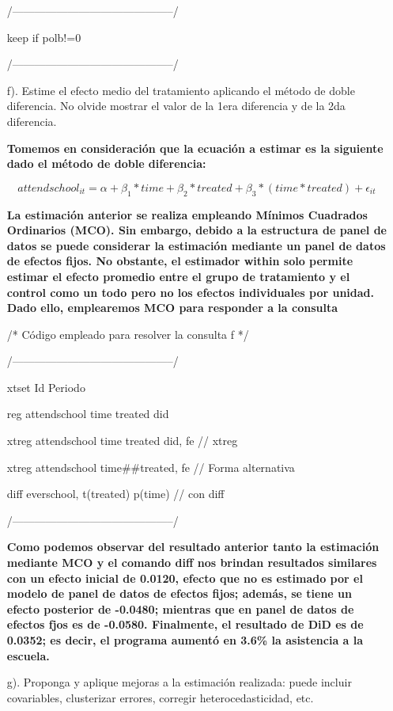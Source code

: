 \documentclass[12pt]{article}
\begin{document}
\begin{enumerate}
\begin{statacode}
/--------------------------------------------/

keep if polb!=0

/--------------------------------------------/
\end{statacode}




\item [f).] Estime el efecto medio del tratamiento aplicando el método de doble diferencia. No olvide mostrar el valor de la 1era diferencia y de la 2da diferencia. 

\textbf{Tomemos en consideración que la ecuación a estimar es la siguiente dado el método de doble diferencia: }

$$ attendschool _{it} = \alpha + \beta_1*time + \beta_2*treated + \beta_3*(time*treated) +\epsilon_{it} $$

\textbf{La estimación anterior se realiza empleando Mínimos Cuadrados Ordinarios (MCO). Sin embargo, debido a la estructura de panel de datos se puede considerar la estimación mediante un panel de datos de efectos fijos. No obstante, el estimador within solo permite estimar el efecto promedio entre el grupo de tratamiento y el control como un todo pero no los efectos individuales por unidad. Dado ello, emplearemos MCO para responder a la consulta }

\begin{statacode}
/* Código empleado para resolver la consulta f */ 

/--------------------------------------------/

xtset Id Periodo

reg attendschool  time treated did


xtreg attendschool time treated did, fe  // xtreg


xtreg attendschool time\#\#treated, fe // Forma alternativa

diff everschool, t(treated) p(time) // con diff

/--------------------------------------------/
\end{statacode}




\textbf{Como podemos observar del resultado anterior tanto la estimación mediante MCO y el comando diff nos brindan resultados similares con un efecto inicial de 0.0120, efecto que no es estimado por el modelo de panel de datos de efectos fijos; además, se tiene un efecto posterior de -0.0480; mientras que en panel de datos de efectos fjos es de -0.0580. Finalmente, el resultado de DiD es de 0.0352; es decir, el programa aumentó en 3.6\% la asistencia a la escuela.}


\item [g).] Proponga y aplique mejoras a la estimación realizada: puede incluir covariables, clusterizar errores, corregir heterocedasticidad, etc. 
\end{enumerate}
\end{document}
